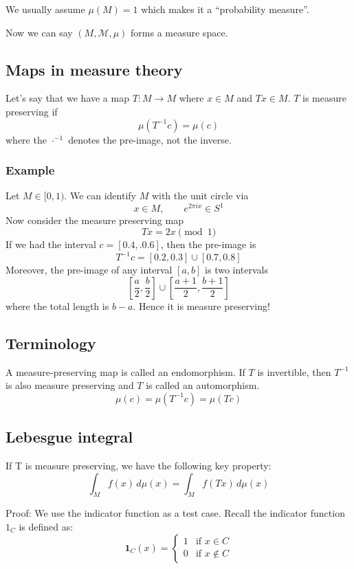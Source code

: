 \documentclass{article}
\begin{document}
We usually assume $\mu\left(M\right)=1$ which makes it a ``probability measure''.

Now we can say $(M,\mathcal{M},\mu)$ forms a measure space.

\subsection{Maps in measure theory}

Let's say that we have a map $T: M\to M$ where $x\in M$ and $Tx\in M$. $T$ is measure preserving if 
\[
\mu\left(T^{-1}c\right)=\mu\left(c\right)
\] 
where the $\cdot^{-1}$ denotes the pre-image, not the inverse.

\subsubsection{Example}
Let $M\in[0,1)$. We can identify $M$ with the unit circle via 
\[
x\in M, \qquad e^{2\pi i x}\in S^1
\]
Now consider the measure preserving map 
\[
Tx = 2x \pmod 1
\]
If we had the interval $c=[0.4,.0.6]$, then the pre-image is 
\[
T^{-1}c = [0.2,0.3]\cup [0.7,0.8]
\]
Moreover, the pre-image of any interval $[a,b]$ is two intervals
\[
\left[\frac{a}{2},\frac{b}{2}\right]\cup \left[\frac{a+1}{2},\frac{b+1}{2}\right]
\]
where the total length is $b-a$. Hence it is measure preserving!

\subsection{Terminology}

A measure-preserving map is called an endomorphism. If $T$ is invertible, then $T^{-1}$ is also measure preserving and $T$ is called an automorphism.
\[
\mu(c)=\mu\left(T^{-1}c\right)=\mu (Tc)
\]

\subsection{Lebesgue integral}

If T is measure preserving, we have the following key property:
\[\int_M f(x) \, d\mu(x) = \int_M f(Tx) \, d\mu(x)\]

Proof: We use the indicator function as a test case.
Recall the indicator function $1_C$ is defined as:
\[
\mathbf{1}_C(x) = \begin{cases} 1 & \text{if } x \in C \\ 0 & \text{if } x \notin C \end{cases}
\]
\end{document}
